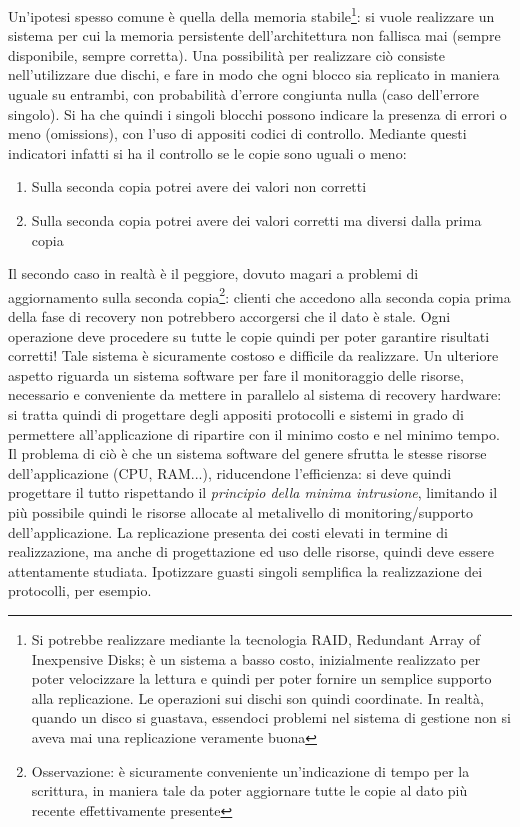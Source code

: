 Un'ipotesi spesso comune è quella della memoria stabile\footnote{Si potrebbe
realizzare mediante la tecnologia RAID,
Redundant Array of Inexpensive Disks; è un sistema a basso costo, inizialmente
realizzato per poter velocizzare la
lettura e quindi per poter fornire un semplice supporto alla replicazione. Le
operazioni sui dischi son quindi
coordinate. In realtà, quando un disco si guastava, essendoci problemi nel
sistema di gestione non si aveva mai una
replicazione veramente buona}: si vuole realizzare un sistema per cui la
memoria persistente dell'architettura non
fallisca mai (sempre disponibile, sempre corretta). Una possibilità per
realizzare ciò consiste nell'utilizzare due
dischi, e fare in modo che ogni blocco sia replicato in maniera uguale su
entrambi, con probabilità d'errore congiunta
nulla (caso dell'errore singolo). Si ha che quindi i singoli blocchi possono
indicare la presenza di errori o meno
(omissions), con l'uso di appositi codici di controllo. Mediante questi
indicatori infatti si ha il controllo se le
copie sono uguali o meno:
\begin{enumerate}
 \item Sulla seconda copia potrei avere dei valori non corretti
 \item Sulla seconda copia potrei avere dei valori corretti ma diversi dalla
prima copia
\end{enumerate}
Il secondo caso in realtà è il peggiore, dovuto magari a problemi di
aggiornamento sulla seconda
copia\footnote{Osservazione: è sicuramente conveniente un'indicazione di tempo
per la scrittura, in maniera tale da
poter aggiornare tutte le copie al dato più recente effettivamente presente}:
clienti che accedono alla seconda copia
prima della fase di recovery non potrebbero accorgersi che il dato è stale.
Ogni operazione deve procedere su tutte le
copie quindi per poter garantire risultati corretti! Tale sistema è sicuramente
costoso e difficile da realizzare.
Un ulteriore aspetto riguarda un sistema software per fare il monitoraggio
delle risorse, necessario e conveniente da mettere in parallelo al sistema di
recovery hardware: si tratta quindi di progettare degli appositi protocolli e
sistemi in grado di permettere all'applicazione di ripartire con il minimo costo
e nel minimo tempo. Il problema di ciò è che un sistema software del genere
sfrutta le stesse risorse dell'applicazione (CPU, RAM...), riducendone
l'efficienza: si deve quindi progettare il tutto rispettando il
\textit{principio della minima intrusione}, limitando il più possibile quindi le
risorse allocate al metalivello di monitoring/supporto dell'applicazione. La
replicazione presenta dei costi elevati in termine di realizzazione, ma anche di
progettazione ed uso delle risorse, quindi deve essere attentamente studiata.
Ipotizzare guasti singoli semplifica la realizzazione dei protocolli, per
esempio.

